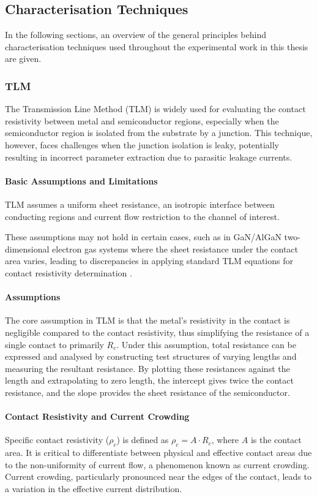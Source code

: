 \begin{refsection}
\subsection{Characterisation Techniques}
In the following sections, an overview of the general principles behind characterisation techniques used throughout the experimental work in this thesis are given.

\subsubsection{TLM}
\label{subsubsection:ltlm_explained}

The Transmission Line Method (TLM) is widely used for evaluating the contact resistivity between metal and semiconductor regions, especially when the semiconductor region is isolated from the substrate by a junction. This technique, however, faces challenges when the junction isolation is leaky, potentially resulting in incorrect parameter extraction due to parasitic leakage currents.

\paragraph{Basic Assumptions and Limitations}
TLM assumes a uniform sheet resistance, an isotropic interface between conducting regions and current flow restriction to the channel of interest.

These assumptions may not hold in certain cases, such as in GaN/AlGaN two-dimensional electron gas systems where the sheet resistance under the contact area varies, leading to discrepancies in applying standard TLM equations for contact resistivity determination \cite{Bystrova2017}.

\paragraph{Assumptions}
The core assumption in TLM is that the metal’s resistivity in the contact is negligible compared to the contact resistivity, thus simplifying the resistance of a single contact to primarily \(R_{c}\). Under this assumption, total resistance can be expressed and analysed by constructing test structures of varying lengths and measuring the resultant resistance. By plotting these resistances against the length and extrapolating to zero length, the intercept gives twice the contact resistance, and the slope provides the sheet resistance of the semiconductor.

\paragraph{Contact Resistivity and Current Crowding}
Specific contact resistivity (\(\rho_{c}\)) is defined as \(\rho_{c} = A \cdot R_{c}\), where \(A\) is the contact area. It is critical to differentiate between physical and effective contact areas due to the non-uniformity of current flow, a phenomenon known as current crowding. Current crowding, particularly pronounced near the edges of the contact, leads to a variation in the effective current distribution.


\end{refsection}
